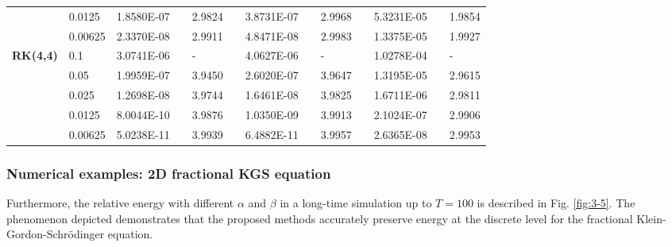 \documentclass[aspectratio=169]{beamer}
\begin{document}
\begin{frame}
\begin{table}[H]
\begin{tabular}{lllllrlrlrlrlrl}
	  \multicolumn{2}{l}{} & \multicolumn{2}{l}{0.0125} & 1.8580E-07 &       & 2.9824  &       & 3.8731E-07 &       & 2.9968  &       & 5.3231E-05 &       & 1.9854  \\
	  \multicolumn{2}{l}{} & \multicolumn{2}{l}{0.00625} & 2.3370E-08 &       & 2.9911  &       & 4.8471E-08 &       & 2.9983  &       & 1.3375E-05 &       & 1.9927  \\
	  \multicolumn{2}{l}{\multirow{5}[1]{*}{\textbf{RK(4,4)}}} & \multicolumn{2}{l}{0.1} & 3.0741E-06 &       & -     &       & 4.0627E-06 &       & -     &       & 1.0278E-04 &       & - \\
	  \multicolumn{2}{l}{} & \multicolumn{2}{l}{0.05} & 1.9959E-07 &       & 3.9450  &       & 2.6020E-07 &       & 3.9647  &       & 1.3195E-05 &       & 2.9615  \\
	  \multicolumn{2}{l}{} & \multicolumn{2}{l}{0.025} & 1.2698E-08 &       & 3.9744  &       & 1.6461E-08 &       & 3.9825  &       & 1.6711E-06 &       & 2.9811  \\
	  \multicolumn{2}{l}{} & \multicolumn{2}{l}{0.0125} & 8.0044E-10 &       & 3.9876  &       & 1.0350E-09 &       & 3.9913  &       & 2.1024E-07 &       & 2.9906  \\
	  \multicolumn{2}{l}{} & \multicolumn{2}{l}{0.00625} & 5.0238E-11 &       & 3.9939  &       & 6.4882E-11 &       & 3.9957  &       & 2.6365E-08 &       & 2.9953  \\
	  \bottomrule
	  \end{tabular}%
	  \label{tab:6-4}%
	  \end{table}%
	\end{frame}
	
	\begin{frame}\frametitle{Numerical examples: 2D fractional KGS equation}
	Furthermore, the relative energy with different $\alpha$ and $\beta$ in a long-time simulation up to $T=100$ is described in Fig. \ref{fig:3-5}.
	  The phenomenon depicted demonstrates that the proposed methods accurately preserve energy at the discrete level for the fractional Klein-Gordon-Schr{\"o}dinger equation.
	\end{frame}
	
\end{document}
